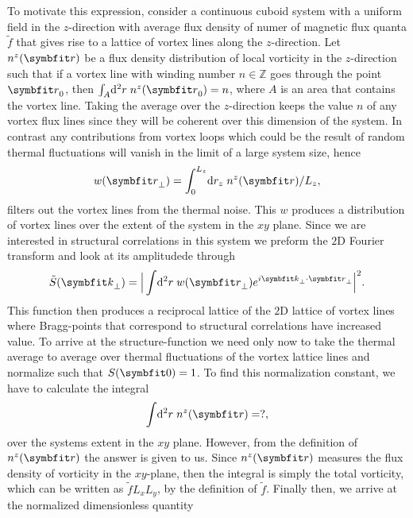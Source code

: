 To motivate this expression, consider a continuous cuboid system with a uniform field in the $z$-direction with average flux density of numer of magnetic flux quanta $\tilde{f}$ that gives rise to a lattice of vortex
lines along the $z$-direction. Let $n^z(\v{r})$ be a flux density distribution of local vorticity in the $z$-direction such that if a vortex line with winding number $n\in\mathbb{Z}$ goes through the point $\v{r}_0$,
then $\int_A\!\mathrm{d}^2r\;n^z(\v{r}_0) = n$, where $A$ is an area that contains the vortex line.
Taking the average over the $z$-direction keeps the value $n$ of any vortex flux lines since they will be coherent over this
dimension of the system. In contrast any contributions from vortex loops which could be the result of random thermal fluctuations will vanish in the limit of a large system size, hence
\begin{equation}
    w(\v{r}_\perp) = \int_0^{L_z}\!\mathrm{d}r_z\;n^z(\v{r}) / L_z,
    \label{eq:Vor:Symm:SF:Cont:xyDist}
\end{equation}
filters out the vortex lines from the thermal noise. This $w$ produces a distribution of vortex lines over the extent of the system in the $xy$ plane.
Since we are interested in structural correlations in this system we preform the $2$D Fourier transform and look at its amplitudede through
\begin{equation}
    \label{eq:Vor:Symm:SF:Cont:unnormalized}
    \tilde{S}(\v{k}_\perp) = \Big|\int\!\mathrm{d}^2r\;w(\v{r}_\perp)e^{i\v{k}_\perp\cdot\v{r}_\perp}\Big|^2.
\end{equation}
This function then produces a reciprocal lattice of the $2$D lattice of vortex lines where Bragg-points that correspond to structural correlations have increased value. To arrive at the structure-function
we need only now to take the thermal average to average over thermal fluctuations of the vortex lattice lines and normalize such that $S(\v{0})=1$. To find this normalization constant, we have to
calculate the integral
\begin{equation}
    \label{eq:Vor:Symm:SF:Cont:normalizationInt}
    \int\!\mathrm{d}^2r\;n^z(\v{r}) = ?,
\end{equation}
over the systems extent in the $xy$ plane. However, from the definition of $n^z(\v{r})$ the answer is given to us. Since $n^z(\v{r})$ measures the flux density of vorticity in the $xy$-plane, then the integral is simply the total vorticity,
which can be written as $\tilde{f}L_xL_y$, by the definition of $\tilde{f}$. Finally then, we arrive at the normalized dimensionless quantity
